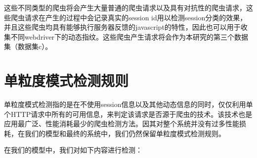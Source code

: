 \documentclass[doctor,privacy,twoside]{buaa_mac}
\begin{document}
这些不同类型的爬虫将会产生大量普通的爬虫请求以及具有对抗性的爬虫请求，这些爬虫请求在产生的过程中会记录真实的session id用以检测session分类的效果，并且这些爬虫均具有能够执行服务器反馈的javascript的特性，因此也可以用于收集不同webdriver下的动态指纹。这些爬虫产生请求将会作为本研究的第三个数据集（数据集c）。

\section{单粒度模式检测规则}
单粒度模式检测指的是在不使用session信息以及其他动态信息的同时，仅仅利用单个HTTP请求中所有的可用信息，来判定该请求是否源于爬虫的技术。该技术也是应用最广泛、性能消耗最少的爬虫检测方法。因其对整个系统并没有过多性能损耗，在我们的模型和最终的系统中，我们仍然保留单粒度模式检测规则。

在我们的模型中，我们对如下内容进行检测：
\end{document}
